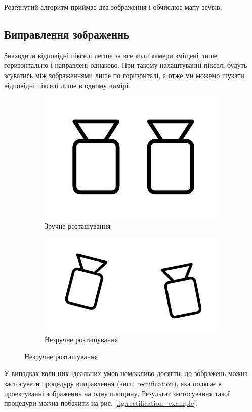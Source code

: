 \documentclass{article}
\theoremstyle{definition}
\begin{document}
Розгянутий алгоритм приймає два зображення і обчислює мапу зсувів.

\subsection{Виправлення зображеннь}
Знаходити відповідні пікселі легше за все коли камери зміщені лише горизонтально і направлені однаково. При такому налаштуванні пікселі будуть зсуватись між зображеннями лише по горизонталі, а отже ми можемо шукати відповідні пікселі лише в одному вимірі.

\begin{figure}[h]
	\begin{subfigure}{.5\textwidth}
		\includegraphics[width=0.6\linewidth]{cameras_conveniently_placed}
		\centering
		\caption{Зручне розташування}
	\end{subfigure}
	\begin{subfigure}{.5\textwidth}
		\includegraphics[width=0.9\linewidth]{cameras_inconveniently_placed}
		\centering
		\caption{Незручне розташування}
	\end{subfigure}
	\centering
	\label{fig:camera_positions}
\end{figure}

У випадках коли цих ідеальних умов неможливо досягти, до зображень можна застосувати процедуру виправлення (англ. rectification), яка полягає в проектуванні зображеннь на одну площину. Результат застосування такої процедури можна побачити на рис. \ref{fig:rectification_example}.
\end{document}
